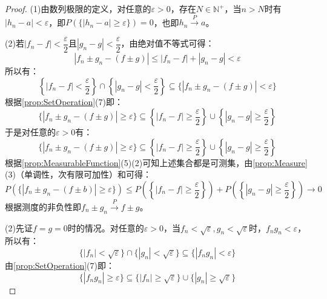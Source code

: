 \begin{proof}
	(1)由数列极限的定义，对任意的$\varepsilon>0$，存在$N\in\mathbb{N}^+$，当$n>N$时有$|h_n-a|<\varepsilon$，即$P(\{|h_n-a|\geqslant\varepsilon\})=0$，也即$h_n\overset{P}{\longrightarrow}a$。\par
	(2)若$|f_n-f|<\dfrac{\varepsilon}{2}$且$|g_n-g|<\dfrac{\varepsilon}{2}$，由绝对值不等式可得：
	\begin{equation*}
		|f_n\pm g_n-(f\pm g)|\leqslant|f_n-f|+|g_n-g|<\varepsilon
	\end{equation*}
	所以有：
	\begin{equation*}
		\left\{|f_n-f|<\frac{\varepsilon}{2}\right\}\cap\left\{|g_n-g|<\frac{\varepsilon}{2}\right\}\subseteq\{|f_n\pm g_n-(f\pm g)|<\varepsilon\}
	\end{equation*}
	根据\cref{prop:SetOperation}(7)即：
	\begin{equation*}
		\{|f_n\pm g_n-(f\pm g)|\geqslant\varepsilon\}\subseteq\left\{|f_n-f|\geqslant\frac{\varepsilon}{2}\right\}\cup\left\{|g_n-g|\geqslant\frac{\varepsilon}{2}\right\}
	\end{equation*}
	于是对任意的$\varepsilon>0$有：
	\begin{equation*}
		\{|f_n\pm g_n-(f\pm g)|\geqslant\varepsilon\}\subseteq\left\{|f_n-f|\geqslant\frac{\varepsilon}{2}\right\}\cup\left\{|g_n-g|\geqslant\frac{\varepsilon}{2}\right\}
	\end{equation*}
	根据\cref{prop:MeasurableFunction}(5)(2)可知上述集合都是可测集，由\cref{prop:Measure}(3)（单调性，次有限可加性）和可得：
	\begin{equation*}
		P(\{|f_n\pm g_n-(f\pm b)|\geqslant\varepsilon\})\leqslant P\left(\left\{|f_n-f|\geqslant\frac{\varepsilon}{2}\right\}\right)+P\left(\left\{|g_n-g|\geqslant\frac{\varepsilon}{2}\right\}\right)\to0
	\end{equation*}
	根据测度的非负性即$f_n\pm g_n\overset{P}{\longrightarrow}f\pm g$。\par
	(2)先证$f=g=0$时的情况。对任意的$\varepsilon>0$，当$f_n<\sqrt{\varepsilon},g_n<\sqrt{\varepsilon}$时，$f_ng_n<\varepsilon$，所以有：
	\begin{equation*}
		\{|f_n|<\sqrt{\varepsilon}\}\cap\{|g_n|<\sqrt{\varepsilon}\}\subseteq\{|f_ng_n|<\varepsilon\}
	\end{equation*}
	由\cref{prop:SetOperation}(7)即：
	\begin{equation*}
		\{|f_ng_n|\geqslant\varepsilon\}\subseteq\{|f_n|\geqslant\sqrt{\varepsilon}\}\cup\{|g_n|\geqslant\sqrt{\varepsilon}\}
	\end{equation*}

\end{proof}

